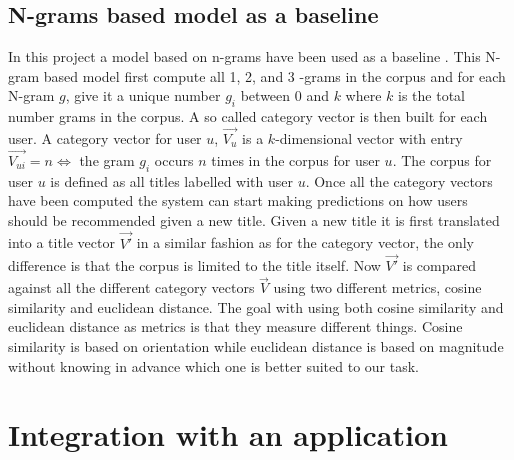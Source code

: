 \subsection{N-grams based model as a baseline}
In this project a model based on n-grams have been used as a baseline \parencite{cavnar1994n}. This N-gram based model first compute  all 1, 2, and 3 -grams in the corpus and for each N-gram $g$, give it a unique number $g_i$ between $0$ and $k$ where $k$ is the total number grams in the corpus. A so called category vector is then built for each user. A category vector for user $u$, $\vec{V_u}$ is a $k$-dimensional vector with entry $\vec{V_{ui}} = n \iff $ the gram $g_i$ occurs $n$ times in the corpus for user $u$. The corpus for user $u$ is defined as all titles labelled with user $u$. Once all the category vectors have been computed the system can start making predictions on how users should be recommended given a new title. Given a new title it is first translated into a title vector $\vec{V'}$ in a similar fashion as for the category vector, the only difference is that the corpus is limited to the title itself. Now $\vec{V'}$ is compared against all the different category vectors $\vec{V}$ using two different metrics, cosine similarity \parencite{steinbach2000comparison} and euclidean distance. The goal with using both cosine similarity and euclidean distance as metrics is that they measure different things. Cosine similarity is based on orientation while euclidean distance is based on magnitude without knowing in advance which one is better suited to our task.  
\section{Integration with an application}


